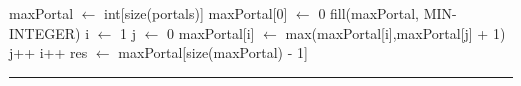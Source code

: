 
\begin{algorithm}[H]
\caption{}
\begin{algorithmic}[1]
\state maxPortal $\gets$ int[size(portals)]
\state maxPortal[0] $\gets$ 0
\state fill(maxPortal, MIN-INTEGER)
\state i $\gets$ 1
\state j $\gets$ 0
			\state maxPortal[i] $\gets$ max(maxPortal[i],maxPortal[j] + 1)
		\endif
		\state j++
	\endwhile
	\state i++
\endwhile
\state res $\gets$ maxPortal[size(maxPortal) - 1]
\EndFunction 
\end{algorithmic}
\hrule
{}
\end{algorithm}
